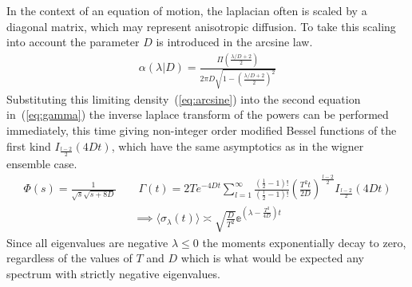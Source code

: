 \documentclass{article}[12pt]
\numberwithin{equation}{section}
\begin{document}
In the context of an equation of motion, the laplacian often is scaled by
a diagonal matrix, which may represent anisotropic diffusion. To take this
scaling into account the parameter $D$ is introduced in the arcsine law.
\begin{align}
  \alpha(\lambda|D)=
    \frac{\Pi\left(\frac{\lambda/D+2}{2}\right)}{2\pi D\sqrt{1-\left(\frac{\lambda/D+2}{2}\right)^2}}
  \label{eq:arcsine}
\end{align}
Substituting this limiting density~(\ref{eq:arcsine}) into the second equation
in~(\ref{eq:gamma}) the inverse laplace transform of the powers can be
performed immediately, this time giving non-integer order modified Bessel
functions of the first kind $I_{\frac{l-2}{2}}(4Dt)$, which have the same
asymptotics as in the wigner ensemble case.
\begin{align}
  \Phi(s)=\frac{1}{\sqrt{s}\sqrt{s+8D}}
  \qquad
  \Gamma(t)=2Te^{-4Dt}
  \sum_{l=1}^{\infty}\frac{(\frac{1}{2}-1)!}{(\frac{l}{2}-1)!}\left(\frac{T^2t}{2D}\right)^{\frac{l-2}{2}}
  I_{\frac{l-2}{2}}(4Dt)
\end{align}
\vspace{-20pt}
\begin{align}
  \implies
  \langle \sigma_{\lambda}(t)\rangle
  \asymp
  \sqrt{\frac{D}{T^2}}\mathbb{e}^{\left(\lambda-\frac{T^2}{4D}\right)t}
\end{align}
Since all eigenvalues are negative $\lambda\leq 0$ the moments exponentially
decay to zero, regardless of the values of $T$ and $D$ which is what would be
expected any spectrum with strictly negative eigenvalues.
\end{document}
